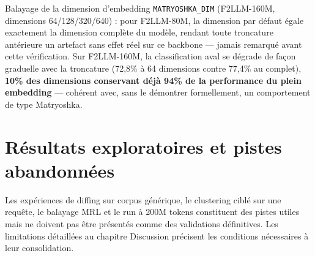 \documentclass[11pt]{article}
\begin{document}
Balayage de la dimension d'embedding \texttt{MATRYOSHKA\_DIM} (F2LLM-160M,
dimensions 64/128/320/640) : pour F2LLM-80M, la dimension par défaut égale
exactement la dimension complète du modèle, rendant toute troncature
antérieure un artefact sans effet réel sur ce backbone --- jamais remarqué
avant cette vérification. Sur F2LLM-160M, la classification aval se dégrade
de façon graduelle avec la troncature (72,8\% à 64 dimensions contre 77,4\%
au complet), \textbf{10\% des dimensions conservant déjà 94\% de la
performance du plein embedding} --- cohérent avec, sans le démontrer
formellement, un comportement de type Matryoshka.

\section{Résultats exploratoires et pistes abandonnées}

Les expériences de diffing sur corpus générique, le clustering ciblé sur une requête,
le balayage MRL et le run à 200M tokens constituent des pistes utiles mais ne doivent
pas être présentés comme des validations définitives. Les limitations détaillées au
chapitre Discussion précisent les conditions nécessaires à leur consolidation.
\end{document}
